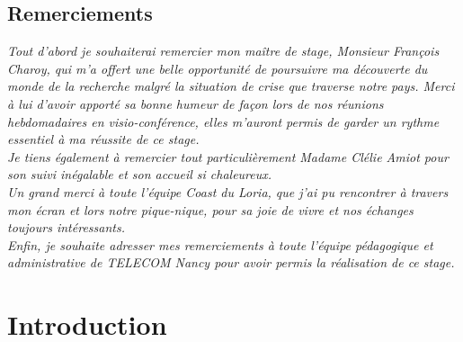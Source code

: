 \documentclass[stage2a]{tnreport} %
\begin{document}
\maketitle
{}



\clearpage

\makesecondtitle

\section*{Remerciements}

{\em
Tout d'abord je souhaiterai remercier mon maître de stage, Monsieur François Charoy, qui m'a offert une belle opportunité de poursuivre ma découverte du monde de la recherche malgré la situation de crise que traverse notre pays. Merci à lui d'avoir apporté sa bonne humeur de façon lors de nos réunions hebdomadaires en visio-conférence, elles m'auront permis de garder un rythme essentiel à ma réussite de ce stage. \\

Je tiens également à remercier tout particulièrement Madame Clélie Amiot pour son suivi inégalable et son accueil si chaleureux. \\

Un grand merci à toute l'équipe Coast du Loria, que j'ai pu rencontrer à travers mon écran et lors notre pique-nique, pour sa joie de vivre et nos échanges toujours intéressants. \\

Enfin, je souhaite adresser mes remerciements à toute l'équipe pédagogique et administrative de TELECOM Nancy pour avoir permis la réalisation de ce stage.
}



\clearpage

\renewcommand{\baselinestretch}{0.5}\normalsize
\tableofcontents
\renewcommand{\baselinestretch}{1.0}\normalsize
\cleardoublepage

\setcounter{page}{1}

\chapter{Introduction}
\end{document}
